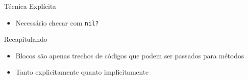 \begin{frame}[fragile,t]{Técnica Explícita}
  \begin{itemize}
    \item Necessário checar com \verb!nil?! 
    
	
  \end{itemize}   
\end{frame}

\begin{frame}[fragile,t]{Recapitulando}
  \begin{itemize}
    \item Blocos são apenas \alert{trechos} de códigos que podem ser passados para métodos
    \item Tanto explicitamente quanto implicitamente
  \end{itemize}
\end{frame}



